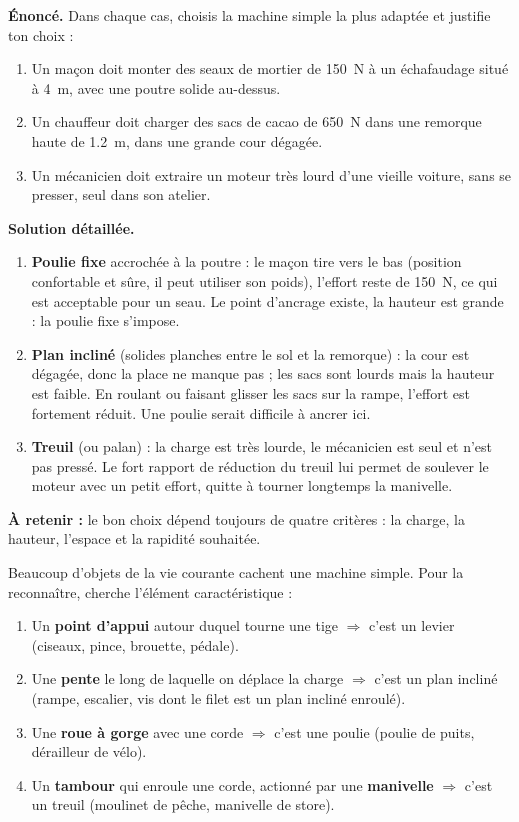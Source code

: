 \documentclass[11pt]{article}
\newcommand{\cle}[1]{{\popxbold\color{popdark}#1}}
\begin{document}
\begin{exoresolu}
\textbf{Énoncé.} Dans chaque cas, choisis la machine simple la plus adaptée et justifie ton choix :
\begin{enumerate}
\item Un maçon doit monter des seaux de mortier de \SI{150}{N} à un échafaudage situé à \SI{4}{m}, avec une poutre solide au-dessus.
\item Un chauffeur doit charger des sacs de cacao de \SI{650}{N} dans une remorque haute de \SI{1,2}{m}, dans une grande cour dégagée.
\item Un mécanicien doit extraire un moteur très lourd d'une vieille voiture, sans se presser, seul dans son atelier.
\end{enumerate}
\tcblower
\textbf{Solution détaillée.}
\begin{enumerate}
\item \textbf{Poulie fixe} accrochée à la poutre : le maçon tire vers le bas (position confortable et sûre, il peut utiliser son poids), l'effort reste de \SI{150}{N}, ce qui est acceptable pour un seau. Le point d'ancrage existe, la hauteur est grande : la poulie fixe s'impose.
\item \textbf{Plan incliné} (solides planches entre le sol et la remorque) : la cour est dégagée, donc la place ne manque pas ; les sacs sont lourds mais la hauteur est faible. En roulant ou faisant glisser les sacs sur la rampe, l'effort est fortement réduit. Une poulie serait difficile à ancrer ici.
\item \textbf{Treuil} (ou palan) : la charge est très lourde, le mécanicien est seul et n'est pas pressé. Le fort rapport de réduction du treuil lui permet de soulever le moteur avec un petit effort, quitte à tourner longtemps la manivelle.
\end{enumerate}
\textbf{À retenir :} le bon choix dépend toujours de quatre critères : la charge, la hauteur, l'espace et la rapidité souhaitée.
\end{exoresolu}

\begin{methode}
Beaucoup d'objets de la vie courante cachent une machine simple. Pour la reconnaître, cherche l'élément caractéristique :
\begin{enumerate}
\item Un \textbf{point d'appui} autour duquel tourne une tige $\Rightarrow$ c'est un \cle{levier} (ciseaux, pince, brouette, pédale).
\item Une \textbf{pente} le long de laquelle on déplace la charge $\Rightarrow$ c'est un \cle{plan incliné} (rampe, escalier, vis dont le filet est un plan incliné enroulé).
\item Une \textbf{roue à gorge} avec une corde $\Rightarrow$ c'est une \cle{poulie} (poulie de puits, dérailleur de vélo).
\item Un \textbf{tambour} qui enroule une corde, actionné par une \textbf{manivelle} $\Rightarrow$ c'est un \cle{treuil} (moulinet de pêche, manivelle de store).
\end{enumerate}
\end{methode}
\end{document}
